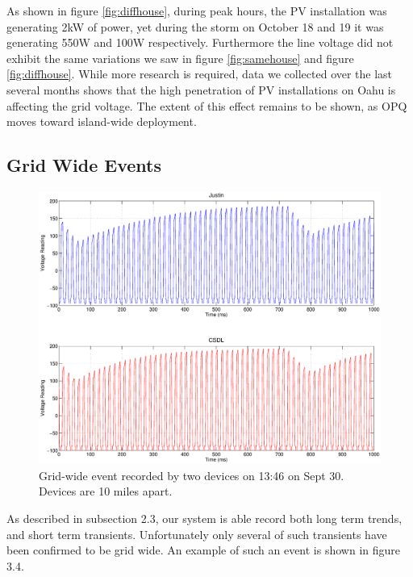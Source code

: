 As shown in figure \ref{fig:diffhouse}, during peak hours, the PV installation  was generating 2kW of power, yet during the storm on October 18 and 19 it was generating 550W and 100W respectively. Furthermore the line voltage did not exhibit the same variations we saw in figure \ref{fig:samehouse} and figure \ref{fig:diffhouse}. While more research is required, data we collected over the last several months shows that the high penetration of PV installations on Oahu is affecting the grid voltage. The extent of this effect remains to be shown, as OPQ moves toward island-wide deployment.

\subsection{Grid Wide Events}

\begin{figure}[h!]
\centering
\includegraphics[width=\textwidth]{img/gridwide.eps}
\caption{Grid-wide event recorded by two devices on 13:46 on Sept 30. Devices are 10 miles apart.}
\label{fig:grid}
\end{figure} 

As described in subsection 2.3, our system is able record both long term trends, and short term transients. Unfortunately only several of such transients have been confirmed to be grid wide. An example of such an event is shown in figure 3.4.


